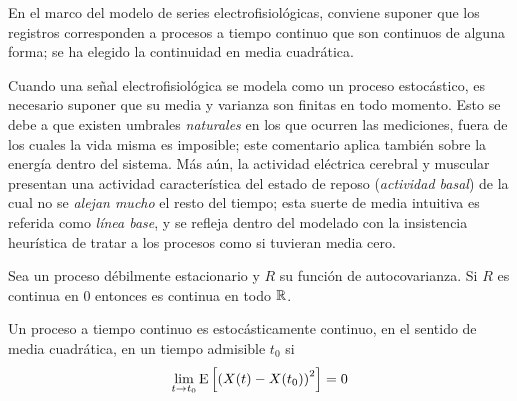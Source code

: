 %
En el marco del modelo de series electrofisiológicas, conviene suponer que los registros 
corresponden a procesos a tiempo continuo que son continuos de alguna forma; se ha elegido la 
continuidad en media cuadrática.

Cuando una señal electrofisiológica se modela como un proceso estocástico, es necesario suponer que su media y varianza son finitas en todo momento. 
%
Esto se debe a que existen umbrales \textit{naturales} en los que ocurren las mediciones, fuera de los cuales la vida misma es imposible; este comentario aplica también sobre la energía dentro del sistema.
%
Más aún, la actividad eléctrica cerebral y muscular presentan una actividad característica del estado de reposo (\textit{actividad basal}) de la cual no se \textit{alejan mucho} el resto del tiempo; esta suerte de media intuitiva es referida como \textit{línea base}, y se refleja dentro del modelado con la insistencia heurística de tratar a los procesos como si tuvieran media cero.

\begin{observacion}
Sea \xt un proceso débilmente estacionario y $R$ su función de autocovarianza. Si $R$ es continua
en 0 entonces es continua en todo $\mathbb{R}$.
\end{observacion}

\begin{definicion}
Un proceso a tiempo continuo \xt es estocásticamente continuo, en el sentido de media cuadrática, 
en un tiempo admisible $t_0$ si
\begin{equation*}
\lim_{t \rightarrow t_0} \mathrm{E}\left[ \left( X(t) - X(t_0) \right)^{2} \right] = 0
\end{equation*}
\label{cont_est}
\end{definicion}



